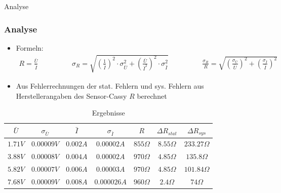 \documentclass[11pt]{beamer}
\begin{document}
\begin{frame}{Analyse}
\subsubsection{Analyse}
\begin{itemize}
\item Formeln:
\begin{align*}
R=\frac{\bar{U}}{\bar{I}} \hspace{2cm} 
\sigma_R=\sqrt{(\frac{1}{\bar{I}})^{2} \cdot \sigma_{\bar{U}}^{2}+(\frac{\bar{U}}{\bar{I}^2})^{2} \cdot \sigma_{\bar{I}}^{2}} \hspace{2cm}\frac{\sigma_R}{R}=\sqrt{(\frac{\sigma_{\bar{U}}}{\bar{U}})^2+(\frac{\sigma_{\bar{I}}}{\bar{I}})^2}
\end{align*}
\item Aus Fehlerrechnungen der stat. Fehlern und sys. Fehlern aus Herstellerangaben des Sensor-Cassy $R$ berechnet
\end{itemize}
\begin{table}[H]\centering
\caption{Ergebnisse}
\begin{tabular}{c|c|c|c|c|c|c}
$\bar{U}$& $\sigma_{\bar{U}}$& $\bar{I}$& $\sigma_{\bar{I}}$& $R$& $\Delta R_{stat}$& $\Delta R_{sys}$ \\ \hline
$1.71V$& $0.00009V$& $0.002A$& $0.00002A$& $855\Omega$& $8.55\Omega$& $233.27\Omega$\\ 
$3.88V$& $0.00008V$& $0.004A$& $0.00002A$& $970\Omega$& $4.85\Omega$& $135.8\Omega$\\ 
$5.82V$& $0.00007V$& $0.006A$& $0.00003A$& $970\Omega$& $4.85\Omega$& $101.84\Omega$ \\
$7.68V$& $0.00009V$& $0.008A$& $0.000026A$& $960\Omega$& $2.4\Omega$& $74\Omega$ \\
\end{tabular} 
\end{table}
\end{frame}
\end{document}
